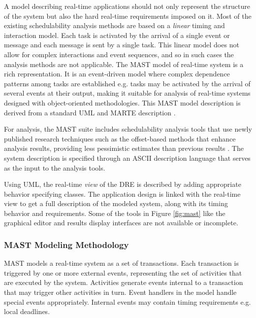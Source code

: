 A model describing real-time applications should not only represent the structure of the system but also the hard real-time requirements imposed on it. Most of the existing schedulability analysis methods are based on a \emph{linear} timing and interaction model. Each task is activated by the arrival of a single event or message and each message is sent by a single task. This linear model does not allow for complex interactions and event sequences, and so in such cases the analysis methods are not applicable. The MAST model of real-time system is a rich representation. It is an event-driven model where complex dependence patterns among tasks are established e.g. tasks may be activated by the arrival of several events at their output, making it suitable for analysis of real-time systems designed with object-oriented methodologies. This MAST model description is derived from a standard UML and MARTE description \cite{medina2011}. 

For analysis, the MAST suite includes schedulability analysis tools that use newly published research techniques such as the offset-based methods \cite{palencia1998schedulability} that enhance analysis results, providing less pessimistic estimates than previous results \cite{tindell1994holistic}. The system description is specified through an ASCII description language that serves as the input to the analysis tools. 

Using UML, the real-time \emph{view} of the DRE is described \cite{selic2000generic} by adding appropriate behavior specifying classes. The application design is linked with the real-time view to get a full description of the modeled system, along with its timing behavior and requirements. Some of the tools in Figure \ref{fig:mast} like the graphical editor and results display interfaces are not available or incomplete.

\subsubsection{MAST Modeling Methodology}

MAST models a real-time system as a set of transactions. Each transaction is triggered by one or more external events, representing the set of activities that are executed by the system. Activities generate events internal to a transaction that may trigger other activities in turn. Event handlers in the model handle special events appropriately. Internal events may contain timing requirements e.g. local deadlines. 

